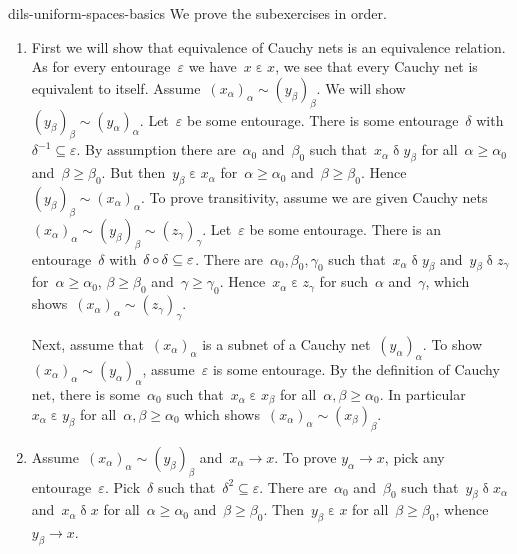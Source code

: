 \begin{solution}{dils-uniform-spaces-basics}%
We prove the subexercises in order.
\begin{enumerate}
\item
First we will show that equivalence of Cauchy nets is an equivalence
    relation.
As for every entourage~$\varepsilon$ we have~$x \mathrel\varepsilon x$,
    we see that every Cauchy net is equivalent to itself.
Assume~$(x_\alpha)_\alpha \sim (y_\beta)_\beta$.
        We will show~$(y_\beta)_\beta \sim (y_\alpha)_\alpha$.
Let~$\varepsilon$ be some entourage.
    There is some entourage~$\delta$ with~$\delta^{-1}\subseteq \varepsilon$.
        By assumption there are~$\alpha_0$ and~$\beta_0$
        such that~$x_\alpha \mathrel{\delta} y_\beta$
        for all~$\alpha \geq \alpha_0$ and~$\beta \geq \beta_0$.
    But then~$y_\beta \mathrel{\varepsilon} x_\alpha$
        for~$\alpha \geq \alpha_0$ and~$\beta \geq\beta_0$.
        Hence~$(y_\beta)_\beta \sim (x_\alpha)_\alpha$.
    To prove transitivity,
assume we are given Cauchy nets~$(x_\alpha)_\alpha \sim (y_\beta)_\beta 
            \sim (z_\gamma)_\gamma$.
Let~$\varepsilon$ be some entourage.
There is an entourage~$\delta$ with~$\delta \mathop{\circ} \delta \subseteq \varepsilon$.
There are~$\alpha_0, \beta_0, \gamma_0$
    such that~$x_\alpha \mathrel\delta y_\beta $
            and~$y_\beta \mathrel\delta z_\gamma $
            for~$\alpha \geq \alpha_0$, $\beta \geq \beta_0$
            and~$\gamma \geq \gamma_0$.
        Hence~$x_\alpha \mathrel\varepsilon z_\gamma$ for such~$\alpha$ and~$\gamma$, which shows~$(x_\alpha)_\alpha \sim (z_\gamma)_\gamma$.

Next, assume that~$(x_\alpha)_\alpha$ is a subnet
        of a Cauchy net~$(y_\alpha)_\alpha$.
    To show~$(x_\alpha)_\alpha \sim (y_\alpha)_\alpha$,
            assume~$\varepsilon$ is some entourage.
    By the definition of Cauchy net,
            there is some~$\alpha_0$
            such that~$x_\alpha \mathrel{\varepsilon} x_\beta$
            for all~$\alpha,\beta \geq \alpha_0$.
    In particular~$x_\alpha \mathrel{\varepsilon} y_\beta$
        for all~$\alpha, \beta \geq \alpha_0$
        which shows~$(x_\alpha)_\alpha \sim (x_\beta)_\beta$.

\item
Assume~$(x_\alpha)_\alpha \sim (y_\beta)_\beta$
    and~$x_\alpha \to x$.
To prove $y_\alpha \to x$, pick any entourage~$\varepsilon$.
Pick~$\delta$ such that~$\delta^2 \subseteq \varepsilon$.
There are~$\alpha_0$ and~$\beta_0$
    such that~$y_\beta \mathrel\delta x_\alpha$
        and~$x_\alpha \mathrel\delta x$
        for all~$\alpha \geq \alpha_0 $ and~$\beta \geq \beta_0$.
    Then~$y_\beta \mathrel\varepsilon x$ for all~$\beta \geq \beta_0$,
        whence~$y_\beta \to x$.


\end{enumerate}
\end{solution}
